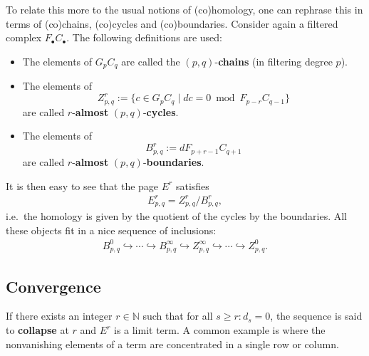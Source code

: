     To relate this more to the usual notions of (co)homology, one can rephrase this in terms of (co)chains, (co)cycles and (co)boundaries. Consider again a filtered complex $F_\bullet C_\bullet$. The following definitions are used:
    \begin{itemize}
        \item The elements of $G_pC_q$ are called the $(p,q)$-\textbf{chains} (in filtering degree $p$).
        \item The elements of \[Z^r_{p,q} := \{c\in G_pC_q\mid dc=0\bmod F_{p-r}C_{q-1}\}\] are called $r$-\textbf{almost} $(p,q)$-\textbf{cycles}.
        \item The elements of \[B^r_{p,q} := dF_{p+r-1}C_{q+1}\] are called $r$-\textbf{almost} $(p,q)$-\textbf{boundaries}.
    \end{itemize}
    It is then easy to see that the page $E^r$ satisfies
    \begin{gather}
        E^r_{p,q} = Z^r_{p,q}/B^r_{p,q},
    \end{gather}
    i.e.~the homology is given by the quotient of the cycles by the boundaries. All these objects fit in a nice sequence of inclusions:
    \begin{gather}
        B^0_{p,q}\hookrightarrow\cdots\hookrightarrow B^\infty_{p,q}\hookrightarrow Z^\infty_{p,q}\hookrightarrow\cdots\hookrightarrow Z^0_{p,q}.
    \end{gather}

\subsection{Convergence}

    \begin{example}
        If there exists an integer $r\in\mathbb{N}$ such that for all $s\geq r:d_s=0$, the sequence is said to \textbf{collapse} at $r$ and $E^r$ is a limit term. A common example is where the nonvanishing elements of a term are concentrated in a single row or column.
    \end{example}

